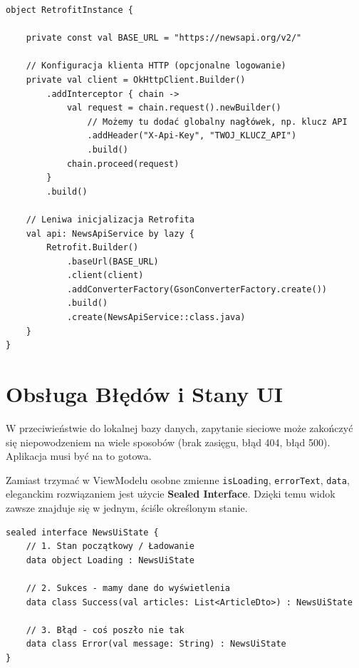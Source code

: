 \begin{verbatim}
object RetrofitInstance {
    
    private const val BASE_URL = "https://newsapi.org/v2/"

    // Konfiguracja klienta HTTP (opcjonalne logowanie)
    private val client = OkHttpClient.Builder()
        .addInterceptor { chain ->
            val request = chain.request().newBuilder()
                // Możemy tu dodać globalny nagłówek, np. klucz API
                .addHeader("X-Api-Key", "TWOJ_KLUCZ_API") 
                .build()
            chain.proceed(request)
        }
        .build()

    // Leniwa inicjalizacja Retrofita
    val api: NewsApiService by lazy {
        Retrofit.Builder()
            .baseUrl(BASE_URL)
            .client(client)
            .addConverterFactory(GsonConverterFactory.create())
            .build()
            .create(NewsApiService::class.java)
    }
}
\end{verbatim}

\section{Obsługa Błędów i Stany UI}

W przeciwieństwie do lokalnej bazy danych, zapytanie sieciowe może zakończyć się niepowodzeniem na wiele sposobów (brak zasięgu, błąd 404, błąd 500). Aplikacja musi być na to gotowa.

Zamiast trzymać w ViewModelu osobne zmienne \texttt{isLoading}, \texttt{errorText}, \texttt{data}, eleganckim rozwiązaniem jest użycie \textbf{Sealed Interface}. Dzięki temu widok zawsze znajduje się w jednym, ściśle określonym stanie.

\begin{verbatim}
sealed interface NewsUiState {
    // 1. Stan początkowy / Ładowanie
    data object Loading : NewsUiState
    
    // 2. Sukces - mamy dane do wyświetlenia
    data class Success(val articles: List<ArticleDto>) : NewsUiState
    
    // 3. Błąd - coś poszło nie tak
    data class Error(val message: String) : NewsUiState
}
\end{verbatim}

